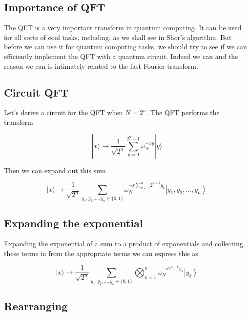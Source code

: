 \documentclass[%
oneside,                 %
final,                   %
10pt]{article}
\begin{document}
\subsection{Importance of QFT}

The QFT is a very important transform in quantum computing. It can be
used for all sorts of cool tasks, including, as we shall see in Shor's
algorithm. But before we can use it for quantum computing tasks, we
should try to see if we can efficiently implement the QFT with a
quantum circuit. Indeed we can and the reason we can is intimately
related to the fast Fourier transform.

\subsection{Circuit QFT}

Let's derive a circuit for the QFT when $N=2^{n}$. The QFT performs the transform

\begin{equation*}
|x\rangle \rightarrow \frac{1}{\sqrt{2^{n}}} \sum_{y=0}^{2^{n}-1} \omega_{N}^{-x y}|y\rangle 
\end{equation*}

Then we can expand out this sum

\begin{equation*}
|x\rangle \rightarrow \frac{1}{\sqrt{2^{n}}} \sum_{y_{1}, y_{2}, \ldots, y_{n} \in\{0,1\}} \omega_{N}^{-x \sum_{k=1}^{n} 2^{n-k} y_{k}}\left|y_{1}, y_{2}, \ldots, y_{n}\right\rangle 
\end{equation*}

\subsection{Expanding the exponential}

Expanding the exponential of a sum to a product of exponentials and
collecting these terms in from the appropriate terms we can express
this as

\begin{equation*}
|x\rangle \rightarrow \frac{1}{\sqrt{2^{n}}} \sum_{y_{1}, y_{2}, \ldots, y_{n} \in\{0,1\}} \bigotimes_{k=1}^{n} \omega_{N}^{-x 2^{n-k} y_{k}}\left|y_{k}\right\rangle 
\end{equation*}

\subsection{Rearranging}
\end{document}
